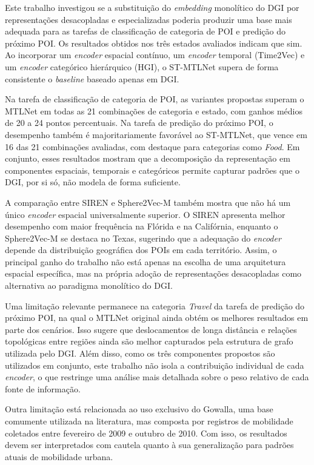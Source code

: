 Este trabalho investigou se a substituição do \textit{embedding} monolítico do DGI por representações desacopladas e especializadas poderia produzir uma base mais adequada para as tarefas de classificação de categoria de POI e predição do próximo POI. Os resultados obtidos nos três estados avaliados indicam que sim. Ao incorporar um \textit{encoder} espacial contínuo, um \textit{encoder} temporal (Time2Vec) e um \textit{encoder} categórico hierárquico (HGI), o ST-MTLNet supera de forma consistente o \textit{baseline} baseado apenas em DGI.

Na tarefa de classificação de categoria de POI, as variantes propostas superam o MTLNet em todas as 21 combinações de categoria e estado, com ganhos médios de 20 a 24 pontos percentuais. Na tarefa de predição do próximo POI, o desempenho também é majoritariamente favorável ao ST-MTLNet, que vence em 16 das 21 combinações avaliadas, com destaque para categorias como \textit{Food}. Em conjunto, esses resultados mostram que a decomposição da representação em componentes espaciais, temporais e categóricos permite capturar padrões que o DGI, por si só, não modela de forma suficiente.

A comparação entre SIREN e Sphere2Vec-M também mostra que não há um único \textit{encoder} espacial universalmente superior. O SIREN apresenta melhor desempenho com maior frequência na Flórida e na Califórnia, enquanto o Sphere2Vec-M se destaca no Texas, sugerindo que a adequação do \textit{encoder} depende da distribuição geográfica dos POIs em cada território. Assim, o principal ganho do trabalho não está apenas na escolha de uma arquitetura espacial específica, mas na própria adoção de representações desacopladas como alternativa ao paradigma monolítico do DGI.

Uma limitação relevante permanece na categoria \textit{Travel} da tarefa de predição do próximo POI, na qual o MTLNet original ainda obtém os melhores resultados em parte dos cenários. Isso sugere que deslocamentos de longa distância e relações topológicas entre regiões ainda são melhor capturados pela estrutura de grafo utilizada pelo DGI. Além disso, como os três componentes propostos são utilizados em conjunto, este trabalho não isola a contribuição individual de cada \textit{encoder}, o que restringe uma análise mais detalhada sobre o peso relativo de cada fonte de informação.

Outra limitação está relacionada ao uso exclusivo do Gowalla, uma base comumente utilizada na literatura, mas composta por registros de mobilidade coletados entre fevereiro de 2009 e outubro de 2010. Com isso, os resultados devem ser interpretados com cautela quanto à sua generalização para padrões atuais de mobilidade urbana.

